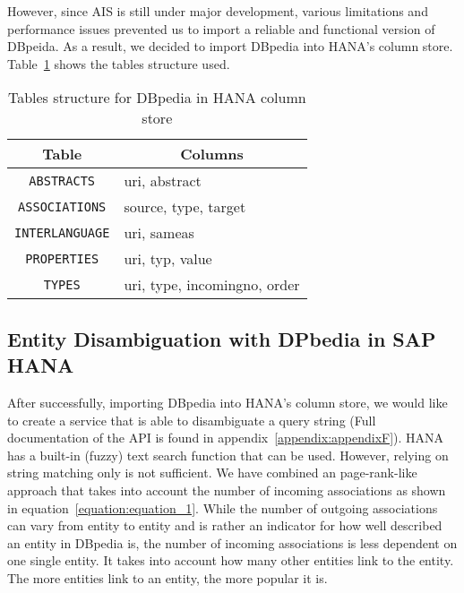 However, since AIS is still under major development, various limitations and performance issues prevented us to import a reliable and functional version of DBpeida. As a result, we decided to import DBpedia into HANA's column store. Table~\ref{dbpedia_tables_hana} shows the tables structure used.

\begin{table}
\centering
\begin{tabular}{|c|l|}
\hline
\multicolumn{1}{|c|}{{\bf Table}} & \multicolumn{1}{c|}{{\bf Columns}} \\ \hline
\texttt{ABSTRACTS}                         & uri, abstract                      \\ \hline
\texttt{ASSOCIATIONS}                      & source, type, target               \\ \hline
\texttt{INTERLANGUAGE}                     & uri, sameas                        \\ \hline
\texttt{PROPERTIES}                        & uri, typ, value                    \\ \hline
\texttt{TYPES}                             & uri, type, incomingno, order       \\ \hline
\end{tabular}
\caption{Tables structure for DBpedia in HANA column store}
\label{dbpedia_tables_hana}
\end{table}

\subsection{Entity Disambiguation with DPbedia in SAP HANA}\label{section:disamigutation_HANA}

After successfully, importing DBpedia into HANA's column store, we would like to create a service that is able to disambiguate a query string (Full documentation of the API is found in appendix~\ref{appendix:appendixF}). HANA has a built-in (fuzzy) text search function that can be used. However, relying on string matching only is not sufficient. We have combined an page-rank-like approach that takes into account the number of incoming associations as shown in equation~\ref{equation:equation_1}. While the number of outgoing associations can vary from entity to entity and is rather an indicator for how well described an entity in DBpedia is, the number of incoming associations is less dependent on one single entity. It takes into account how many other entities link to the entity. The more entities link to an entity, the more popular it is.

